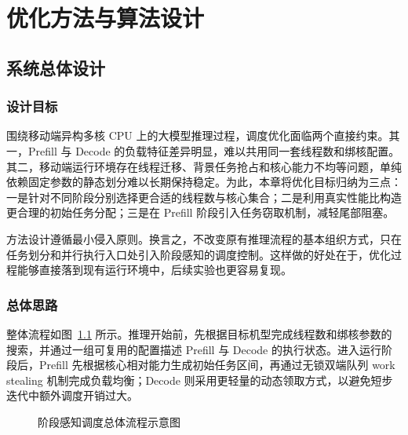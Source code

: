 \chapter{优化方法与算法设计}

\section{系统总体设计}

\subsection{设计目标}

围绕移动端异构多核 CPU 上的大模型推理过程，调度优化面临两个直接约束。其一，Prefill 与 Decode 的负载特征差异明显，难以共用同一套线程数和绑核配置。其二，移动端运行环境存在线程迁移、背景任务抢占和核心能力不均等问题，单纯依赖固定参数的静态划分难以长期保持稳定。为此，本章将优化目标归纳为三点：一是针对不同阶段分别选择更合适的线程数与核心集合；二是利用真实性能比构造更合理的初始任务分配；三是在 Prefill 阶段引入任务窃取机制，减轻尾部阻塞。

方法设计遵循最小侵入原则。换言之，不改变原有推理流程的基本组织方式，只在任务划分和并行执行入口处引入阶段感知的调度控制。这样做的好处在于，优化过程能够直接落到现有运行环境中，后续实验也更容易复现。

\subsection{总体思路}

整体流程如图~\ref{fig:chapter3_overview_placeholder} 所示。推理开始前，先根据目标机型完成线程数和绑核参数的搜索，并通过一组可复用的配置描述 Prefill 与 Decode 的执行状态。进入运行阶段后，Prefill 先根据核心相对能力生成初始任务区间，再通过无锁双端队列 work stealing 机制完成负载均衡；Decode 则采用更轻量的动态领取方式，以避免短步迭代中额外调度开销过大。

\begin{figure}[ht]
  \centering
  \caption{阶段感知调度总体流程示意图}
  \label{fig:chapter3_overview_placeholder}
\end{figure}

